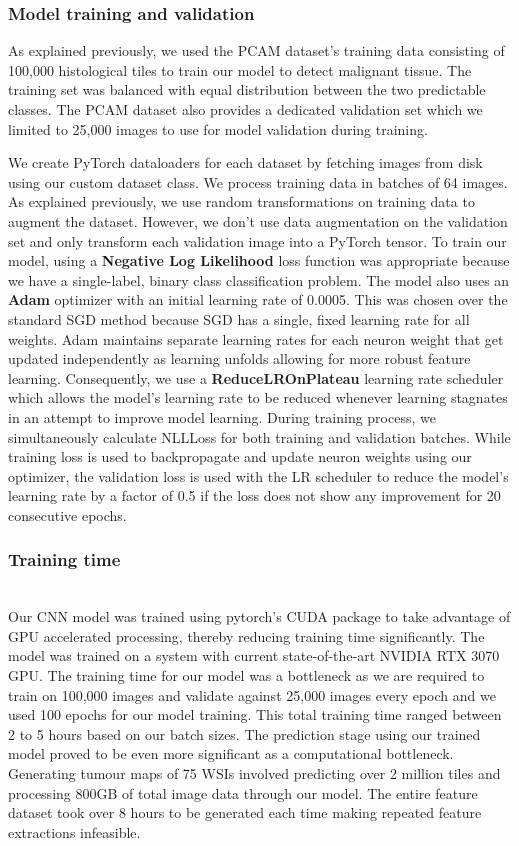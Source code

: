 \documentclass{l4proj}
\begin{document}
\subsubsection{Model training and validation}
As explained previously, we used the PCAM dataset's training data consisting of 100,000 histological tiles to train our model to detect malignant tissue. The training set was balanced with equal distribution between the two predictable classes. The PCAM dataset also provides a dedicated validation set which we limited to 25,000 images to use for model validation during training. 

We create PyTorch dataloaders for each dataset by fetching images from disk using our custom dataset class. We process training data in batches of 64 images. As explained previously, we use random transformations on training data to augment the dataset. However, we don't use data augmentation on the validation set and only transform each validation image into a PyTorch tensor. To train our model, using a \textbf{Negative Log Likelihood} loss function was appropriate because we have a single-label, binary class classification problem. The model also uses an \textbf{Adam} optimizer with an initial learning rate of 0.0005. This was chosen over the standard SGD method because SGD has a single, fixed learning rate for all weights. Adam maintains separate learning rates for each neuron weight that get updated independently as learning unfolds allowing for more robust feature learning. Consequently, we use a \textbf{ReduceLROnPlateau} learning rate scheduler which allows the model's learning rate to be reduced whenever learning stagnates in an attempt to improve model learning. During training process, we simultaneously calculate NLLLoss for both training and validation batches. While training loss is used to backpropagate and update neuron weights using our optimizer, the validation loss is used with the LR scheduler to reduce the model's learning rate by a factor of 0.5 if the loss does not show any improvement for 20 consecutive epochs. 
\\
\subsubsection{Training time}\hfill\\
Our CNN model was trained using pytorch's CUDA package to take advantage of GPU accelerated processing, thereby reducing training time significantly. The model was trained on a system with current state-of-the-art NVIDIA RTX 3070 GPU. The training time for our model was a bottleneck as we are required to train on 100,000 images and validate against 25,000 images every epoch and we used 100 epochs for our model training. This total training time ranged between 2 to 5 hours based on our batch sizes.
The prediction stage using our trained model proved to be even more significant as a computational bottleneck. Generating tumour maps of 75 WSIs involved predicting over 2 million tiles and processing 800GB of total image data through our model. The entire feature dataset took over 8 hours to be generated each time making repeated feature extractions infeasible.
\\
\end{document}
